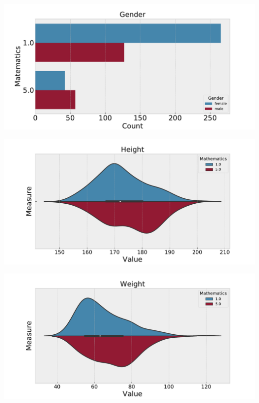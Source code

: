 \documentclass[russian, 10pt]{beamer}
\begin{document}
\begin{frame}

\centering
\includegraphics[scale=0.45]{images/11.pdf}

\end{frame}

\begin{frame}

\centering
\includegraphics[scale=0.45]{images/12.pdf}

\end{frame}

\begin{frame}

\centering
\includegraphics[scale=0.45]{images/13.pdf}

\end{frame}
\end{document}
